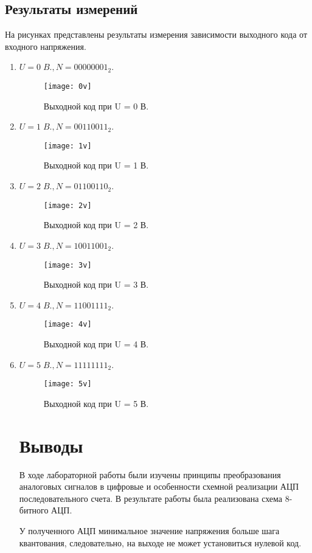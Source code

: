 \documentclass[a4paper,14pt]{extarticle}
\begin{document}
\subsection{Результаты измерений}
На рисунках представлены результаты измерения зависимости выходного
кода от входного напряжения.
\begin{enumerate}
    \item $U = 0 \; B., N = 00000001_{2}$.
        \begin{figure}[H]
            \centering
            \texttt{[image: 0v]}
            \caption{Выходной код при U = 0 В.}
            \label{fig:0v}
        \end{figure}
    \item $U = 1 \; B., N = 00110011_{2}$.
        \begin{figure}[H]
            \centering
            \texttt{[image: 1v]}
            \caption{Выходной код при U = 1 В.}
            \label{fig:1v}
        \end{figure}
    \item $U = 2 \; B., N = 01100110_{2}$.
        \begin{figure}[H]
            \centering
            \texttt{[image: 2v]}
            \caption{Выходной код при U = 2 В.}
            \label{fig:2v}
        \end{figure}
        \pagebreak
    \item $U = 3 \; B., N = 10011001_{2}$.
        \begin{figure}[H]
            \centering
            \texttt{[image: 3v]}
            \caption{Выходной код при U = 3 В.}
            \label{fig:3v}
        \end{figure}
    \item $U = 4 \; B., N = 11001111_{2}$.
        \begin{figure}[H]
            \centering
            \texttt{[image: 4v]}
            \caption{Выходной код при U = 4 В.}
            \label{fig:4v}
        \end{figure}
    \item $U = 5 \; B., N = 11111111_{2}$.
        \begin{figure}[H]
            \centering
            \texttt{[image: 5v]}
            \caption{Выходной код при U = 5 В.}
            \label{fig:5v}
        \end{figure}
\section*{Выводы}
В ходе лабораторной работы были изучены принципы преобразования аналоговых
сигналов в цифровые и особенности схемной реализации АЦП последовательного
счета. В результате работы была реализована схема 8-битного АЦП.

У полученного АЦП минимальное значение напряжения больше шага квантования,
следовательно, на выходе не может установиться нулевой код.
\end{enumerate}
\end{document}
